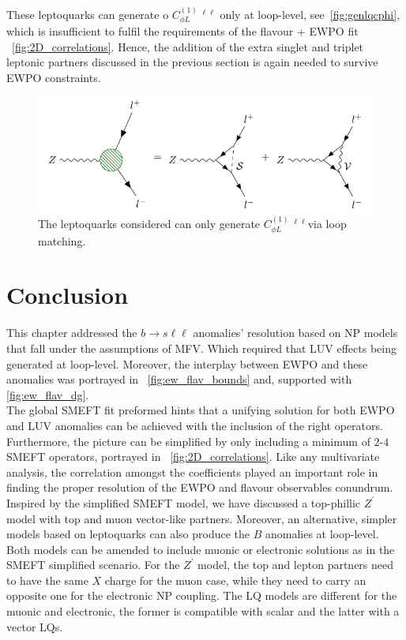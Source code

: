 These leptoquarks can generate o $C_{\phi L}^{(1)}\ ^{\ell\ell}$ only at loop-level, see~\autoref{fig:genlqcphi}, which is insufficient to fulfil the requirements of the flavour + EWPO fit ~\autoref{fig:2D_correlations}. Hence, the addition of the extra singlet and triplet leptonic partners discussed in the previous section is again needed to survive EWPO constraints.
\begin{figure}[htpb!]
	\centering 
	\includegraphics[width=\linewidth]{figures/LQ_tri}
	\caption{The leptoquarks considered can only generate  $C_{\phi L}^{(1)}\ ^{\ell\ell}$via loop matching. }    
	\label{fig:genlqcphi}
\end{figure}
\section{Conclusion}
\label{sec:sum}
This chapter addressed the $b \to s \ell \ell $ anomalies' resolution based on NP models that fall under the assumptions of MFV. Which required that LUV effects being generated at loop-level.  Moreover, the interplay between EWPO and these anomalies was portrayed in ~\autoref{fig:ew_flav_bounds} and, supported with \autoref{fig:ew_flav_dg}. \\

The global SMEFT fit preformed hints that a unifying solution for both EWPO and LUV anomalies can be achieved with the inclusion of the right operators. Furthermore, the picture can be simplified by only including a minimum of $2$-$4$ SMEFT operators, portrayed in ~\autoref{fig:2D_correlations}. Like any multivariate analysis, the correlation amongst the coefficients played an important role in finding the proper resolution of the EWPO and flavour observables conundrum. \\ 
Inspired by the simplified SMEFT model, we have discussed a top-phillic $Z^\prime$ model with top and muon vector-like partners. Moreover, an alternative, simpler models based on leptoquarks can also produce the $B$ anomalies at loop-level. Both models can be amended to include muonic or electronic solutions as in the SMEFT simplified scenario. For the $Z^\prime$ model, the top and lepton partners need to have the same $X$ charge for the muon case, while they need to carry an opposite one for the electronic NP coupling.  The LQ models are different for the muonic and electronic, the former is compatible with scalar and the latter with a vector LQs. \\ 

